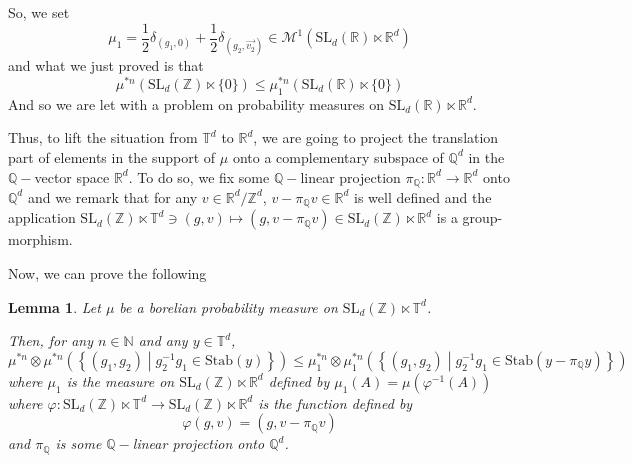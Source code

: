 \documentclass[11pt]{amsart}
\newtheorem{lemma}[theorem]{Lemma}
\theoremstyle{definition}
\theoremstyle{remark}
\numberwithin{equation}{section}
\begin{document}
So, we set
\[
\mu_1 = \frac 1 2 \delta_{(g_1,0)} + \frac 1 2 \delta_{(g_2,\overrightarrow{ v_2})} \in \mathcal{M}^1 \left(\mathrm{SL}_d({\mathbb R}) \ltimes {\mathbb R}^d \right)
\]
and what we just proved is that
\[
\mu^{\ast n} \left( \mathrm{SL}_d({\mathbb Z}) \ltimes \{0\}\right) \leqslant \mu_1^{\ast n} \left( \mathrm{SL}_d({\mathbb R}) \ltimes \{0\}\right)
\]
And so we are let with a problem on probability measures on $\mathrm{SL}_d({\mathbb R}) \ltimes {\mathbb R}^d$.

\medskip
Thus, to lift the situation from ${\mathbb T}^d$ to ${\mathbb R}^d$, we are going to project the translation part of elements in the support of $\mu$ onto a complementary subspace of ${\mathbb Q}^d$ in the ${\mathbb Q}-$vector space ${\mathbb R}^d$. To do so, we fix some ${\mathbb Q}-$linear projection $\pi_{\mathbb Q}:{\mathbb R}^d \to {\mathbb R}^d$ onto ${\mathbb Q}^d$ and we remark that for any $v\in {\mathbb R}^d/{\mathbb Z}^d$, $v-\pi_{\mathbb Q} v \in {\mathbb R}^d$ is well defined and the application $\mathrm{SL}_d({\mathbb Z}) \ltimes {\mathbb T}^d \ni (g,v) \mapsto (g,v-\pi_{\mathbb Q} v) \in \mathrm{SL}_d({\mathbb Z}) \ltimes {\mathbb R}^d$ is a group-morphism.

Now, we can prove the following
\begin{lemma} \label{lemma:mesure_stab_tore}
Let $\mu$ be a borelian probability measure on $\mathrm{SL}_d({\mathbb Z}) \ltimes {\mathbb T}^d$.

Then, for any $n\in {\mathbb N}$ and any $y\in {\mathbb T}^d$,
\[
\mu^{\ast n} \otimes\mu^{\ast n} \left( \left\{(g_1,g_2) \middle| g_2^{-1} g_1 \in \mathrm{Stab}(y)\right\} \right) \leqslant \mu_1^{\ast n} \otimes \mu_1^{\ast n} \left( \left\{(g_1,g_2) \middle| g_2^{-1} g_1 \in \mathrm{Stab}(y-\pi_{\mathbb Q} y)\right\} \right)
\]
where $\mu_1$ is the measure on $\mathrm{SL}_d({\mathbb Z}) \ltimes {\mathbb R}^d$ defined by $\mu_1 (A) = \mu(\varphi^{-1}(A))$ where $\varphi: \mathrm{SL}_d({\mathbb Z}) \ltimes {\mathbb T}^d \to \mathrm{SL}_d({\mathbb Z}) \ltimes {\mathbb R}^d$ is the function defined by
\[
\varphi(g,v) = (g,v-\pi_{\mathbb Q} v)
\]
and $\pi_{\mathbb Q}$ is some ${\mathbb Q}-$linear projection onto ${\mathbb Q}^d$.
\end{lemma}
\end{document}
